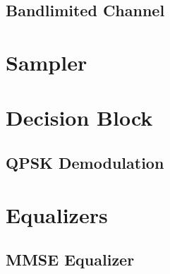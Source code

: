 \documentclass[]{article}
\begin{document}
\subsection{Bandlimited Channel}
\label{app:bandlimited}


\section{Sampler}
\label{app:sampler}


\section{Decision Block}
\label{app:dblocks}
\subsection{QPSK Demodulation}
\label{app:qpsk_demod}


\section{Equalizers}
\subsection{MMSE Equalizer}

\end{document}
